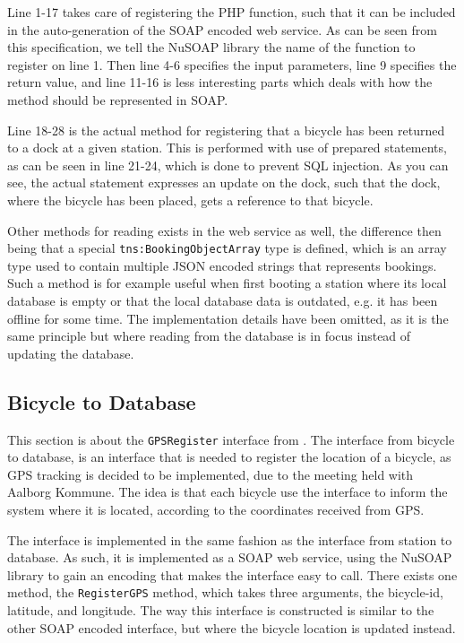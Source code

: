 Line 1-17 takes care of registering the PHP function, such that it can be included in the auto-generation of the SOAP encoded web service.
As can be seen from this specification, we tell the NuSOAP library the name of the function to register on line 1.
Then line 4-6 specifies the input parameters, line 9 specifies the return value, and line 11-16 is less interesting parts which deals with how the method should be represented in SOAP.

Line 18-28 is the actual method for registering that a bicycle has been returned to a dock at a given station.
This is performed with use of prepared statements, as can be seen in line 21-24, which is done to prevent SQL injection.
As you can see, the actual statement expresses an update on the dock, such that the dock, where the bicycle has been placed, gets a reference to that bicycle.

Other methods for reading exists in the web service as well, the difference then being that a special \texttt{tns:BookingObjectArray} type is defined, which is an array type used to contain multiple JSON encoded strings that represents bookings. Such a method is for example useful when first booting a station where its local database is empty or that the local database data is outdated, e.g. it has been offline for some time.
The implementation details have been omitted, as it is the same principle but where reading from the database is in focus instead of updating the database.

\subsection{Bicycle to Database}
This section is about the \texttt{GPSRegister} interface from .
The interface from bicycle to database, is an interface that is needed to register the location of a bicycle, as GPS tracking is decided to be implemented, due to the meeting held with Aalborg Kommune.
The idea is that each bicycle use the interface to inform the system where it is located, according to the coordinates received from GPS.

The interface is implemented in the same fashion as the interface from station to database.
As such, it is implemented as a SOAP web service, using the NuSOAP library to gain an encoding that makes the interface easy to call.
There exists one method, the \texttt{RegisterGPS} method, which takes three arguments, the bicycle-id, latitude, and longitude.
The way this interface is constructed is similar to the other SOAP encoded interface, but where the bicycle location is updated instead.